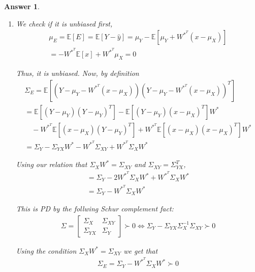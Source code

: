 \documentclass[12pt]{article}
\theoremstyle{colon}
\newtheorem*{answer}{Answer}
\begin{document}
\begin{answer}
\begin{enumerate}[label=\alph*)]
      As $\Sigma_Y$ is PD ($\Sigma$ is PD implies $\Sigma_Y$ is PD by picking vectors that zero out the $X$ components), so is $\Sigma_E$. Using part a), we get that the MSE is:
      \begin{gather*}
        MSE(\hat{y}) = trace(\Sigma_Y)
      \end{gather*}

    \item We check if it is unbiased first,
      \begin{gather*}
        \mu_E = \mathbb{E}[E] = \mathbb{E}[Y - \hat{y}] = \mu_Y - \mathbb{E}[\mu_Y + W^{*^T} (x - \mu_X)] \\
        = - W^{*^T}\mathbb{E}[x] + W^{*^T}\mu_X = 0
      \end{gather*}

      Thus, it is unbiased. Now, by definition
      \begin{gather*}
        \Sigma_E = \mathbb{E}[(Y - \mu_Y -  W^{*^T} (x - \mu_X))(Y - \mu_Y -  W^{*^T} (x - \mu_X))^T] \\
        = \mathbb{E}[(Y - \mu_Y)(Y - \mu_Y)^T] - \mathbb{E}[(Y - \mu_Y)(x - \mu_X)^T] W^* \\
        \quad- W^{*^T} \mathbb{E}[(x - \mu_X)(Y - \mu_Y)^T] + W^{*^T} \mathbb{E}[(x - \mu_X)(x - \mu_X)^T] W^* \\
        = \Sigma_Y - \Sigma_{YX} W^* - W^{*^T} \Sigma_{XY} + W^{*^T} \Sigma_X W^*
      \end{gather*}

      Using our relation that $\Sigma_X W^* = \Sigma_{XY}$ and $\Sigma_{XY} = \Sigma_{YX}^T$,
      \begin{gather*}
        = \Sigma_Y - 2 W^{*^T} \Sigma_X W^* + W^{*^T} \Sigma_X W^* \\
        = \Sigma_Y- W^{*^T} \Sigma_X W^*
      \end{gather*}

      This is PD by the follwing Schur complement fact:
      \begin{gather*}
        \Sigma = \begin{bmatrix} \Sigma_X & \Sigma_{XY} \\ \Sigma_{YX} & \Sigma_Y \end{bmatrix} \succ 0 \Longleftrightarrow \Sigma_Y - \Sigma_{YX} \Sigma_X^{-1} \Sigma_{XY} \succ 0
      \end{gather*}

      Using the condition $\Sigma_X W^* = \Sigma_{XY}$ we get that
      \begin{gather*}
        \Sigma_E = \Sigma_Y- W^{*^T} \Sigma_X W^* \succ 0
      \end{gather*}


\end{enumerate}
\end{answer}
\end{document}
